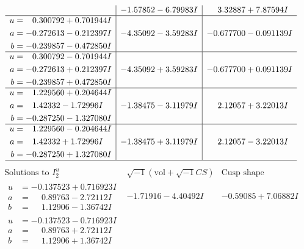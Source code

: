 \documentclass[1p]{elsarticle_modified}
\theoremstyle{definition}
\newcommand{\I}{\sqrt{-1}}
\begin{document}
$$\begin{array}{c|c|c}
 & -1.57852 - 6.79983 I & \phantom{-}3.32887 + 7.87594 I \\ \hline\begin{aligned}
u &= \phantom{-}0.300792 + 0.701944 I \\
a &= -0.272613 - 0.212397 I \\
b &= -0.239857 - 0.472850 I\end{aligned}
 & -4.35092 - 3.59283 I & -0.677700 - 0.091139 I \\ \hline\begin{aligned}
u &= \phantom{-}0.300792 - 0.701944 I \\
a &= -0.272613 + 0.212397 I \\
b &= -0.239857 + 0.472850 I\end{aligned}
 & -4.35092 + 3.59283 I & -0.677700 + 0.091139 I \\ \hline\begin{aligned}
u &= \phantom{-}1.229560 + 0.204644 I \\
a &= \phantom{-}1.42332 - 1.72996 I \\
b &= -0.287250 - 1.327080 I\end{aligned}
 & -1.38475 - 3.11979 I & \phantom{-}2.12057 + 3.22013 I \\ \hline\begin{aligned}
u &= \phantom{-}1.229560 - 0.204644 I \\
a &= \phantom{-}1.42332 + 1.72996 I \\
b &= -0.287250 + 1.327080 I\end{aligned}
 & -1.38475 + 3.11979 I & \phantom{-}2.12057 - 3.22013 I\\
 \hline 
 \end{array}$$\newpage$$\begin{array}{c|c|c}  
\text{Solutions to }I^u_{2}& \I (\text{vol} + \sqrt{-1}CS) & \text{Cusp shape}\\
 \hline 
\begin{aligned}
u &= -0.137523 + 0.716923 I \\
a &= \phantom{-}0.89763 - 2.72112 I \\
b &= \phantom{-}1.12906 - 1.36742 I\end{aligned}
 & -1.71916 - 4.40492 I & -0.59085 + 7.06882 I \\ \hline\begin{aligned}
u &= -0.137523 - 0.716923 I \\
a &= \phantom{-}0.89763 + 2.72112 I \\
b &= \phantom{-}1.12906 + 1.36742 I\end{aligned}

\end{array}$$
\end{document}
